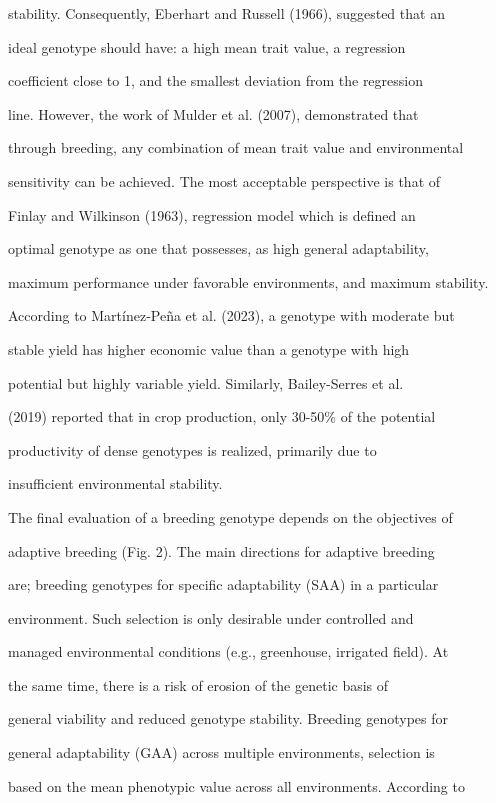 \documentclass[10pt,twoside]{article}
\numberwithin{equation}{section}
\begin{document}
stability. Consequently, Eberhart and Russell (1966), suggested that an

ideal genotype should have: a high mean trait value, a regression

coefficient close to 1, and the smallest deviation from the regression

line. However, the work of Mulder et al. (2007), demonstrated that

through breeding, any combination of mean trait value and environmental

sensitivity can be achieved. The most acceptable perspective is that of

Finlay and Wilkinson (1963), regression model which is defined an

optimal genotype as one that possesses, as high general adaptability,

maximum performance under favorable environments, and maximum stability.

According to Martínez-Peña et al. (2023), a genotype with moderate but

stable yield has higher economic value than a genotype with high

potential but highly variable yield. Similarly, Bailey-Serres et al.

(2019) reported that in crop production, only 30-50\% of the potential

productivity of dense genotypes is realized, primarily due to

insufficient environmental stability.



The final evaluation of a breeding genotype depends on the objectives of

adaptive breeding (Fig. 2). The main directions for adaptive breeding

are; breeding genotypes for specific adaptability (SAA) in a particular

environment. Such selection is only desirable under controlled and

managed environmental conditions (e.g., greenhouse, irrigated field). At

the same time, there is a risk of erosion of the genetic basis of

general viability and reduced genotype stability. Breeding genotypes for

general adaptability (GAA) across multiple environments, selection is

based on the mean phenotypic value across all environments. According to
\end{document}
